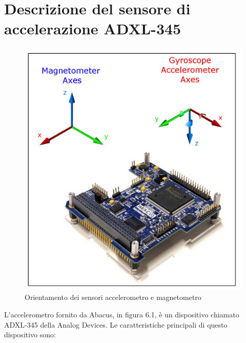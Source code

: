 \documentclass[LaM,binding=0.6cm,oneside]{../sapthesis}
\begin{document}
\section{Descrizione del sensore di accelerazione ADXL-345}
\begin{figure}[htbp]
\centerline{\includegraphics[scale=0.5]{examples/AbacusAccelerometer.PNG}}
\caption{Orientamento dei sensori accelerometro e magnetometro}
\label{fig}
\end{figure}
\vspace{0.5cm}
L’accelerometro fornito da Abacus, in figura 6.1, è un dispositivo chiamato ADXL-345 della Analog Devices.
Le caratteristiche principali di questo dispositivo sono:
\end{document}
